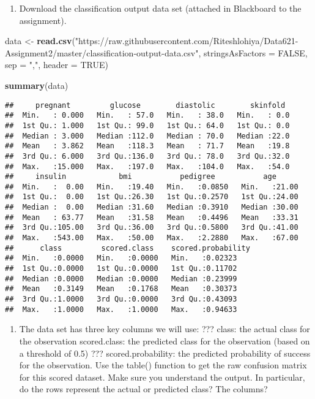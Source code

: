 \documentclass[]{article}
\newenvironment{Shaded}{\begin{snugshade}}{\end{snugshade}}
\newcommand{\KeywordTok}[1]{\textcolor[rgb]{0.13,0.29,0.53}{\textbf{#1}}}
\newcommand{\DataTypeTok}[1]{\textcolor[rgb]{0.13,0.29,0.53}{#1}}
\newcommand{\StringTok}[1]{\textcolor[rgb]{0.31,0.60,0.02}{#1}}
\newcommand{\OtherTok}[1]{\textcolor[rgb]{0.56,0.35,0.01}{#1}}
\newcommand{\NormalTok}[1]{#1}
\providecommand{\tightlist}{%
  \setlength{\itemsep}{0pt}\setlength{\parskip}{0pt}}
\begin{document}
\begin{enumerate}
\def\labelenumi{\arabic{enumi}.}
\tightlist
\item
  Download the classification output data set (attached in Blackboard to
  the assignment).
\end{enumerate}

\begin{Shaded}
\begin{Highlighting}[]
\NormalTok{data <-}\StringTok{ }\KeywordTok{read.csv}\NormalTok{(}\StringTok{"https://raw.githubusercontent.com/Riteshlohiya/Data621-Assignment2/master/classification-output-data.csv"}\NormalTok{, }\DataTypeTok{stringsAsFactors =} \OtherTok{FALSE}\NormalTok{, }\DataTypeTok{sep =} \StringTok{","}\NormalTok{, }\DataTypeTok{header =} \OtherTok{TRUE}\NormalTok{)}

\KeywordTok{summary}\NormalTok{(data)}
\end{Highlighting}
\end{Shaded}

\begin{verbatim}
##     pregnant         glucose        diastolic        skinfold   
##  Min.   : 0.000   Min.   : 57.0   Min.   : 38.0   Min.   : 0.0  
##  1st Qu.: 1.000   1st Qu.: 99.0   1st Qu.: 64.0   1st Qu.: 0.0  
##  Median : 3.000   Median :112.0   Median : 70.0   Median :22.0  
##  Mean   : 3.862   Mean   :118.3   Mean   : 71.7   Mean   :19.8  
##  3rd Qu.: 6.000   3rd Qu.:136.0   3rd Qu.: 78.0   3rd Qu.:32.0  
##  Max.   :15.000   Max.   :197.0   Max.   :104.0   Max.   :54.0  
##     insulin            bmi           pedigree           age       
##  Min.   :  0.00   Min.   :19.40   Min.   :0.0850   Min.   :21.00  
##  1st Qu.:  0.00   1st Qu.:26.30   1st Qu.:0.2570   1st Qu.:24.00  
##  Median :  0.00   Median :31.60   Median :0.3910   Median :30.00  
##  Mean   : 63.77   Mean   :31.58   Mean   :0.4496   Mean   :33.31  
##  3rd Qu.:105.00   3rd Qu.:36.00   3rd Qu.:0.5800   3rd Qu.:41.00  
##  Max.   :543.00   Max.   :50.00   Max.   :2.2880   Max.   :67.00  
##      class         scored.class    scored.probability
##  Min.   :0.0000   Min.   :0.0000   Min.   :0.02323   
##  1st Qu.:0.0000   1st Qu.:0.0000   1st Qu.:0.11702   
##  Median :0.0000   Median :0.0000   Median :0.23999   
##  Mean   :0.3149   Mean   :0.1768   Mean   :0.30373   
##  3rd Qu.:1.0000   3rd Qu.:0.0000   3rd Qu.:0.43093   
##  Max.   :1.0000   Max.   :1.0000   Max.   :0.94633
\end{verbatim}

\begin{enumerate}
\def\labelenumi{\arabic{enumi}.}
\setcounter{enumi}{1}
\tightlist
\item
  The data set has three key columns we will use: ??? class: the actual
  class for the observation scored.class: the predicted class for the
  observation (based on a threshold of 0.5) ??? scored.probability: the
  predicted probability of success for the observation. Use the table()
  function to get the raw confusion matrix for this scored dataset. Make
  sure you understand the output. In particular, do the rows represent
  the actual or predicted class? The columns?
\end{enumerate}
\end{document}

